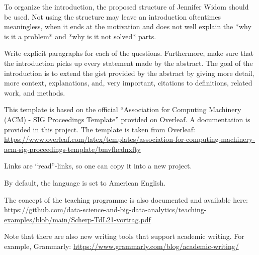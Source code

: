 \documentclass[sigconf, review, nonacm]{acmart}
\begin{document}
\begin{tcolorbox}[title=Instructions: Write following this structure.]

To organize the introduction, the proposed structure of Jennifer Widom should be used. 
Not using the structure may leave an introduction oftentimes meaningless, when it ends at the motivation and does not well explain the *why is it a problem* and *why is it not solved* parts.

Write explicit paragraphs for each of the questions. 
Furthermore, make sure that the introduction picks up every statement made by the abstract.
The goal of the introduction is to extend the gist provided by the abstract by giving more detail, more context, explanations, and, very important, citations to definitions, related work, and methods.
\end{tcolorbox}

This template is based on the official ``Association for Computing Machinery (ACM) - SIG Proceedings Template'' provided on Overleaf. A documentation is provided in this project. The template is taken from Overleaf:
\url{https://www.overleaf.com/latex/templates/association-for-computing-machinery-acm-sig-proceedings-template/bmvfhcdnxfty}




Links are ``read''-links, so one can copy it into a new project.

By default, the language is set to American English.

The concept of the teaching programme is also documented and available here:
\url{https://github.com/data-science-and-big-data-analytics/teaching-examples/blob/main/Scherp-TdL21-vortrag.pdf}

Note that there are also new writing tools that support academic writing. 
For example, Grammarly: \url{https://www.grammarly.com/blog/academic-writing/}

\label{sec:introduction}
\end{document}
